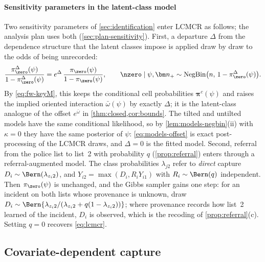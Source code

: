 \paragraph{Sensitivity parameters in the latent-class model}
Two sensitivity parameters of \cref{sec:identification} enter LCMCR as follows; the analysis plan uses both (\cref{sec:plan-sensitivity}). First, a departure $\Delta$ from the dependence structure that the latent classes impose is applied draw by draw to the odds of being unrecorded:
\begin{equation}\label{eq:models-offset}
  \frac{\pi^{\Delta}_{\zero}(\psi)}{1-\pi^{\Delta}_{\zero}(\psi)}=e^{\Delta}\,\frac{\pi_{\zero}(\psi)}{1-\pi_{\zero}(\psi)},
  \qquad
  \nzero\mid\psi,\bm n_+\sim\operatorname{NegBin}\bigl(n,\,1-\pi^{\Delta}_{\zero}(\psi)\bigr).
\end{equation}
By \eqref{eq:fw-keyM}, this keeps the conditional cell probabilities $\bm\pi^c(\psi)$ and raises the implied oriented interaction $\bar\omega(\psi)$ by exactly $\Delta$; it is the latent-class analogue of the offset $e^{\bar\omega}$ in \cref{thm:closed,cor:bounds}. The tilted and untilted models have the same conditional likelihood, so by \cref{lem:models-negbin}(ii) with $\kappa=0$ they have the same posterior of $\psi$: \eqref{eq:models-offset} is exact post-processing of the LCMCR draws, and $\Delta=0$ is the fitted model. Second, referral from the police list to list~2 with probability $q$ (\cref{prop:referral}) enters through a referral-augmented model. The class probabilities $\lambda_{j2}$ refer to \emph{direct} capture $D_i\sim\Bern(\lambda_{z_i2})$, and $Y_{i2}=\max(D_i,R_iY_{i1})$ with $R_i\sim\Bern(q)$ independent. Then $\pi_{\zero}(\psi)$ is unchanged, and the Gibbs sampler gains one step: for an incident on both lists whose provenance is unknown, draw $D_i\sim\Bern\{\lambda_{z_i2}/(\lambda_{z_i2}+q(1-\lambda_{z_i2}))\}$; where provenance records how list~2 learned of the incident, $D_i$ is observed, which is the recoding of \cref{prop:referral}(c). Setting $q=0$ recovers \eqref{eq:lcmcr}.

\subsection{Covariate-dependent capture}\label{sec:models-cov}

